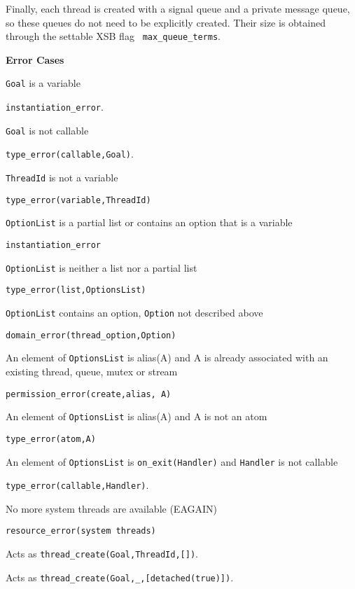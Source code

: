 \begin{description}
Finally, each thread is created with a signal queue and a private
message queue, so these queues do not need to be explicitly created.
Their size is obtained through the settable XSB flag {\tt
  max\_queue\_terms}.

{\bf Error Cases}
\bi
\item 	{\tt Goal} is a variable
\bi
\item 	{\tt instantiation\_error}.
\ei
\item 	{\tt Goal} is not callable
\bi
\item 	{\tt type\_error(callable,Goal)}.
\ei
\item 	{\tt ThreadId} is not a variable
\bi
\item 	{\tt type\_error(variable,ThreadId)}
\ei
\item 	{\tt OptionList} is a partial list or contains an option that is a variable
\bi
\item 	{\tt instantiation\_error}
\ei
\item 	{\tt OptionList} is neither a list nor a partial list
\bi
\item 	{\tt type\_error(list,OptionsList)}
\ei
\item 	{\tt OptionList} contains an option, {\tt Option} not described above
\bi
\item 	{\tt domain\_error(thread\_option,Option)}
\ei
\item An element of {\tt OptionsList} is alias(A) and A is already
  associated with an existing thread, queue, mutex or stream 
\bi
\item {\tt permission\_error(create,alias, A)}
\ei
\item An element of {\tt OptionsList} is alias(A) and A is not an atom
\bi
\item {\tt type\_error(atom,A)}
\ei
\item An element of {\tt OptionsList} is {\tt on\_exit(Handler)} and
      {\tt Handler} is not callable 
\bi
\item 	{\tt type\_error(callable,Handler)}.
\ei
\item   No more system threads are available (EAGAIN)
\bi
\item {\tt resource\_error(system threads)}
\ei
\ei

%
Acts as {\tt thread\_create(Goal,ThreadId,[])}.

%
Acts as {\tt thread\_create(Goal,\_,[detached(true)])}.


\end{description}
